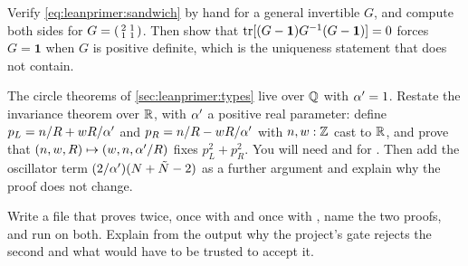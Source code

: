 \begin{exercise}\label{ex:leanprimer:sandwich}
Verify \eqref{eq:leanprimer:sandwich} by hand for a general invertible $G$, and
compute both sides for $G=\begin{psmallmatrix}2&1\\1&1\end{psmallmatrix}$. Then show that
$\operatorname{tr}[(G-\mathbf 1)G^{-1}(G-\mathbf 1)]=0$ forces $G=\mathbf 1$ when $G$ is positive
definite, which is the uniqueness statement that  does not contain.
\end{exercise}

\begin{exercise}
\label{ex:leanprimer:faithful}
The circle theorems of \cref{sec:leanprimer:types} live over $\mathbb{Q}$ with $\alpha'=1$. Restate
the invariance theorem  over $\mathbb{R}$, with $\alpha'$ a
positive real parameter: define $p_L = n/R + wR/\alpha'$ and $p_R = n/R - wR/\alpha'$ with
$n, w : \mathbb{Z}$ cast to $\mathbb{R}$, and prove that $(n,w,R)\mapsto(w,n,\alpha'/R)$ fixes $p_L^2+p_R^2$. You will need
 and  for . Then add the oscillator
term $(2/\alpha')(N+\tilde N-2)$ as a further argument and explain why the proof does not
change.
\end{exercise}

\begin{exercise}\label{ex:leanprimer:audit}
Write a file that proves  twice, once with
 and once with , name the two proofs, and run
 on both. Explain from the output why the project's gate rejects the
second and what would have to be trusted to accept it.
\end{exercise}

